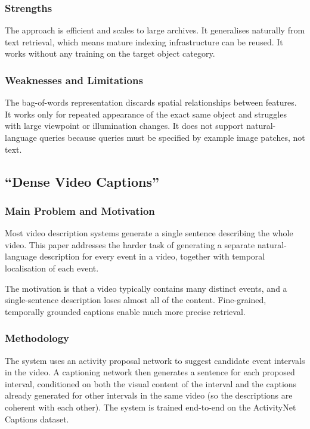 \documentclass[12pt, a4paper]{report}
\begin{document}
\subsubsection{Strengths}

The approach is efficient and scales to large archives. It generalises
naturally from text retrieval, which means mature indexing infrastructure
can be reused. It works without any training on the target object category.

\subsubsection{Weaknesses and Limitations}

The bag-of-words representation discards spatial relationships between features.
It works only for repeated appearance of the exact same object and struggles
with large viewpoint or illumination changes. It does not support natural-language
queries because queries must be specified by example image patches, not text.

\subsection{``Dense Video Captions'' \cite{krishna2017dense}}

\subsubsection{Main Problem and Motivation}

Most video description systems generate a single sentence describing the
whole video. This paper addresses the harder task of generating a separate
natural-language description for every event in a video, together with
temporal localisation of each event.

The motivation is that a video typically contains many distinct events, and
a single-sentence description loses almost all of the content. Fine-grained,
temporally grounded captions enable much more precise retrieval.

\subsubsection{Methodology}

The system uses an activity proposal network to suggest candidate event
intervals in the video. A captioning network then generates a sentence
for each proposed interval, conditioned on both the visual content of
the interval and the captions already generated for other intervals in
the same video (so the descriptions are coherent with each other).
The system is trained end-to-end on the ActivityNet Captions dataset.
\end{document}
